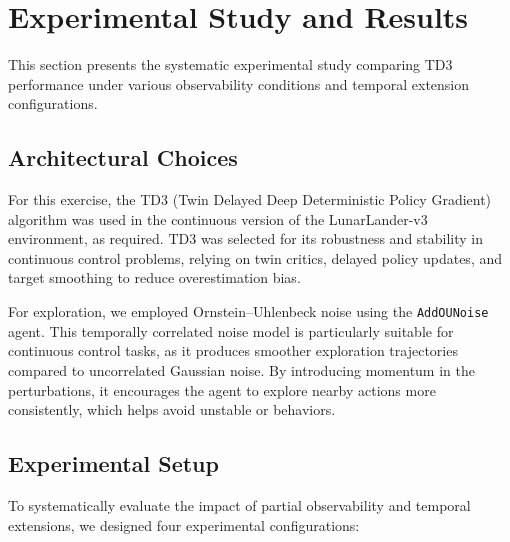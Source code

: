 \documentclass[12pt, a4paper]{article}
\begin{document}


\section{Experimental Study and Results}

This section presents the systematic experimental study comparing TD3 performance under various observability conditions and temporal extension configurations.

\subsection{Architectural Choices}

For this exercise, the TD3 (Twin Delayed Deep Deterministic Policy Gradient) algorithm was used in the continuous version of the LunarLander-v3 environment, as required. TD3 was selected for its robustness and stability in continuous control problems, relying on twin critics, delayed policy updates, and target smoothing to reduce overestimation bias.

For exploration, we employed Ornstein–Uhlenbeck noise using the \texttt{AddOUNoise} agent. This temporally correlated noise model is particularly suitable for continuous control tasks, as it produces smoother exploration trajectories compared to uncorrelated Gaussian noise. By introducing momentum in the perturbations, it encourages the agent to explore nearby actions more consistently, which helps avoid unstable or behaviors.

\subsection{Experimental Setup}

To systematically evaluate the impact of partial observability and temporal extensions, we designed four experimental configurations:
\end{document}
